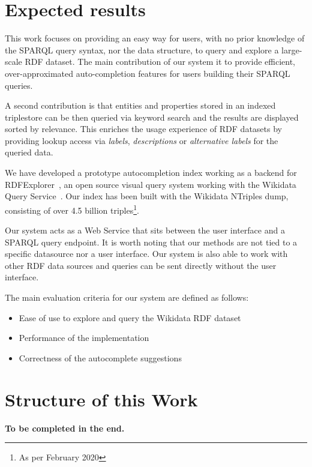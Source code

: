\section{Expected results}

This work focuses on providing an easy way for users, with no prior knowledge of the SPARQL query syntax, nor the data structure, to query and explore a large-scale RDF dataset. The main contribution of our system it to provide efficient, over-approximated auto-completion features for users building their SPARQL queries. 

A second contribution is that entities and properties stored in an indexed triplestore can be then queried via keyword search and the results are displayed sorted by relevance. This enriches the usage experience of RDF datasets by providing lookup access via \textit{labels}, \textit{descriptions} or \textit{alternative labels} for the queried data.

We have developed a prototype autocompletion index working as a backend for RDFExplorer~\cite{Vargas2019}, an open source visual query system working with the Wikidata Query Service~\cite{wikidataQueryService}. Our index has been built with the Wikidata NTriples dump, consisting of over 4.5 billion triples\footnote{As per February 2020}. 

Our system acts as a Web Service that sits between the user interface and a SPARQL query endpoint. It is worth noting that our methods are not tied to a specific datasource nor a user interface. Our system is also able to work with other RDF data sources and queries can be sent directly without the user interface.

The main evaluation criteria for our system are defined as follows:

\begin{itemize}
    \item Ease of use to explore and query the Wikidata RDF dataset
    \item Performance of the implementation
    \item Correctness of the autocomplete suggestions
\end{itemize}

\section{Structure of this Work}

\textbf{To be completed in the end.}